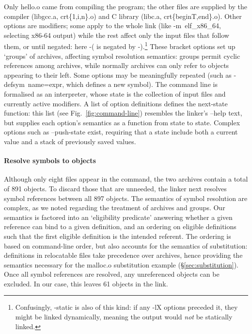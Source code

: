 \documentclass[preprint,10pt]{sigplanconf-pldi16}
\begin{document}
Only \textsf{hello.o} came from compiling the program;
the other files are supplied by the compiler (\textsf{libgcc.a}, \textsf{crt\{1,i,n\}.o})
and C library (\textsf{libc.a}, \textsf{crt\{beginT,end\}.o}).
Other options are modifiers; some apply to the whole link 
(like \textsf{-m~elf\_x86\_64}, selecting x86-64 output)
while the rest affect only the input files that follow them, or until negated: 
here \mbox{\textsf{-(}} is negated by \mbox{\textsf{-)}}.\footnote{Confusingly, \textsf{-static} is 
also of this kind: if any \textsf{-lX} options preceded it, they might be linked dynamically, meaning the output
would \emph{not} be statically linked.}
These bracket options set up `groups' of archives, affecting symbol resolution semantics: groups permit 
cyclic references among archives, while normally archives can only refer to objects appearing to their left.
Some options may be meaningfully repeated
(such as \textsf{-\-defsym~name=expr}, which defines a new symbol).
The command line is formalised as an interpreter, whose state 
is the collection of input files and currently active modifiers.
A list of option definitions defines the next-state function: 
this list (see Fig.~\ref{fig:command-line}) resembles the linker's \textsf{--help} text, 
but supplies each option's semantics as a function from state to state.
Complex options such as \textsf{--push-state} exist, requiring that a state include both a current value and a stack of previously saved values.



\paragraph{Resolve symbols to objects} 
Although only eight files appear in the command, the two archives contain a total of 891 objects.
To discard those that are unneeded, the linker next resolves symbol references between all 897 objects.
The semantics of symbol resolution are complex, as 
we noted regarding the treatment of archives and groups.
Our semantics is factored into an `eligibility predicate' answering whether a given
reference can bind to a given definition, and an 
ordering on eligible definitions such that
the first eligible definition is the intended referent.
The ordering is based on command-line order, but also accounts for the semantics of 
substitution: definitions in relocatable files take precedence over archives, hence 
providing the semantics necessary for the \textsf{malloc.o} substitution example (\S\ref{sec:substitution}).
Once all symbol references are resolved, any unreferenced objects can be excluded.
In our case, this leaves 61 objects in the link.
\end{document}
